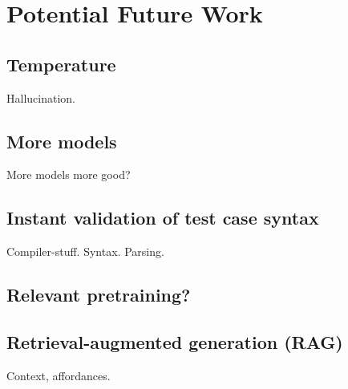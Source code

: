\section{Potential Future Work}

\subsection{Temperature}
Hallucination.

\subsection{More models}
More models more good?

\subsection{Instant validation of test case syntax}
Compiler-stuff. Syntax. Parsing.

\subsection{Relevant pretraining?}

\subsection{Retrieval-augmented generation (RAG)}
Context, affordances.